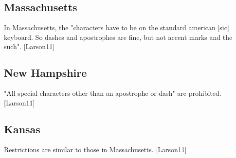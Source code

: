 \subsection{Massachusetts}

In Massachusetts, the "characters have to be on the standard american
{[}sic{]} keyboard. So dashes and apostrophes are fine, but not accent
marks and the such". {[}Larson11{]}

\subsection{New Hampshire}

"All special characters other than an apostrophe or dash" are
prohibited. {[}Larson11{]}

\subsection{Kansas}

Restrictions are similar to those in Massachusetts. {[}Larson11{]}
